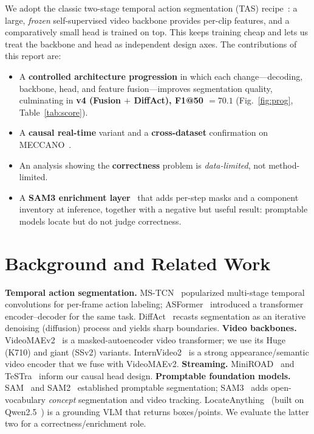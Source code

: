 \documentclass[11pt]{article}
\newcommand{\best}[1]{\textcolor{best}{\textbf{#1}}}
\begin{document}
We adopt the classic two-stage temporal action segmentation (TAS) recipe~\cite{mstcn,asformer}: a large,
\emph{frozen} self-supervised video backbone provides per-clip features, and a comparatively small head is trained
on top. This keeps training cheap and lets us treat the backbone and head as independent design axes. The
contributions of this report are:
\begin{itemize}
  \item A \textbf{controlled architecture progression} in which each change---decoding, backbone, head, and
  feature fusion---improves segmentation quality, culminating in \best{v4 (Fusion $+$ DiffAct), F1@50 $=70.1$}
  (Fig.~\ref{fig:prog}, Table~\ref{tab:score}).
  \item A \textbf{causal real-time} variant and a \textbf{cross-dataset} confirmation on MECCANO~\cite{meccano}.
  \item An analysis showing the \textbf{correctness} problem is \emph{data-limited}, not method-limited.
  \item A \textbf{SAM3 enrichment layer}~\cite{sam3} that adds per-step masks and a component inventory at inference,
  together with a negative but useful result: promptable models locate but do not judge correctness.
\end{itemize}

\section{Background and Related Work}
\textbf{Temporal action segmentation.} MS-TCN~\cite{mstcn} popularized multi-stage temporal convolutions for
per-frame action labeling; ASFormer~\cite{asformer} introduced a transformer encoder--decoder for the same task.
DiffAct~\cite{diffact} recasts segmentation as an iterative denoising (diffusion) process and yields sharp
boundaries. \textbf{Video backbones.} VideoMAEv2~\cite{videomae} is a masked-autoencoder video transformer;
we use its Huge (K710) and giant (SSv2) variants. InternVideo2~\cite{internvideo2} is a strong appearance/semantic
video encoder that we fuse with VideoMAEv2. \textbf{Streaming.} MiniROAD~\cite{miniroad} and TeSTra~\cite{testra}
inform our causal head design. \textbf{Promptable foundation models.} SAM~\cite{sam} and SAM2~\cite{sam2}
established promptable segmentation; SAM3~\cite{sam3} adds open-vocabulary \emph{concept} segmentation and video
tracking. LocateAnything~\cite{locateanything} (built on Qwen2.5~\cite{qwen25}) is a grounding VLM that returns
boxes/points. We evaluate the latter two for a correctness/enrichment role.
\end{document}
